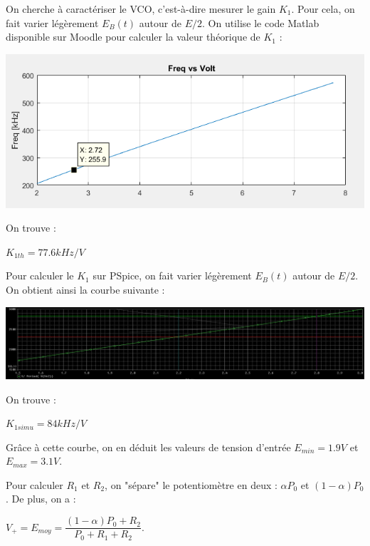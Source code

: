 \documentclass[a4paper]{report}
\begin{document}
On cherche à caractériser le VCO, c'est-à-dire mesurer le gain $K_1$. Pour cela, on fait varier légèrement $E_B (t)$ autour de $E/2$. On utilise le code Matlab disponible sur Moodle pour calculer la valeur théorique de $K_1$ :

\begin{center}
\includegraphics[width=1\textwidth]{K1_th.PNG}
\end{center}

On trouve :

\begin{center}
$K_{1th} = 77.6 kHz/V$
\end{center}

Pour calculer le $K_1$ sur PSpice, on fait varier légèrement $E_B (t)$ autour de $E/2$. On obtient ainsi la courbe suivante :

\begin{center}
\includegraphics[width=1\textwidth]{K1_simu.PNG}
\end{center}

On trouve :

\begin{center}
$K_{1simu} = 84 kHz/V$
\end{center}

Grâce à cette courbe, on en déduit les valeurs de tension d'entrée $E_{min} = 1.9V$ et $E_{max} = 3.1V$.

Pour calculer $R_1$ et $R_2$, on "sépare" le potentiomètre en deux : $\alpha P_0$ et $(1-\alpha)P_0$. De plus, on a :

$V_+ = E_{moy} = \dfrac{(1-\alpha)P_0 + R_2}{P_0 + R_1 + R_2}.$
\\
\end{document}

